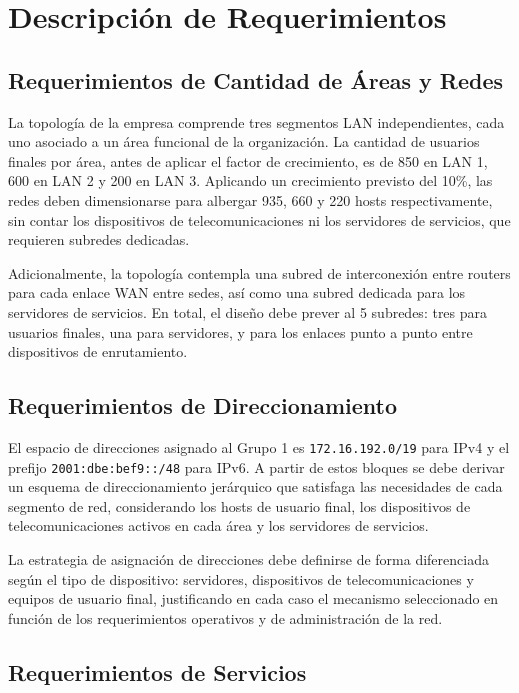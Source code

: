 \section{Descripción de Requerimientos}

\subsection{Requerimientos de Cantidad de Áreas y Redes}

La topología de la empresa comprende tres segmentos LAN independientes,
cada uno asociado a un área funcional de la organización. La cantidad de
usuarios finales por área, antes de aplicar el factor de crecimiento, es
de 850 en LAN 1, 600 en LAN 2 y 200 en LAN 3. Aplicando un crecimiento
previsto del 10\%, las redes deben dimensionarse para albergar 935, 660 y
220 hosts respectivamente, sin contar los dispositivos de telecomunicaciones
ni los servidores de servicios, que requieren subredes dedicadas.

Adicionalmente, la topología contempla una subred de interconexión entre
routers para cada enlace WAN entre sedes, así como una subred dedicada para
los servidores de servicios. En total, el diseño debe prever al 5
subredes: tres para usuarios finales, una para servidores, y 
para los enlaces punto a punto entre dispositivos de enrutamiento.

\subsection{Requerimientos de Direccionamiento}

El espacio de direcciones asignado al Grupo 1 es \texttt{172.16.192.0/19}
para IPv4 y el prefijo \texttt{2001:dbe:bef9::/48} para IPv6. A partir de
estos bloques se debe derivar un esquema de direccionamiento jerárquico que
satisfaga las necesidades de cada segmento de red, considerando los hosts de
usuario final, los dispositivos de telecomunicaciones activos en cada área y
los servidores de servicios.

La estrategia de asignación de direcciones debe definirse de forma diferenciada
según el tipo de dispositivo: servidores, dispositivos de telecomunicaciones y
equipos de usuario final, justificando en cada caso el mecanismo seleccionado
en función de los requerimientos operativos y de administración de la red.

\subsection{Requerimientos de Servicios}

